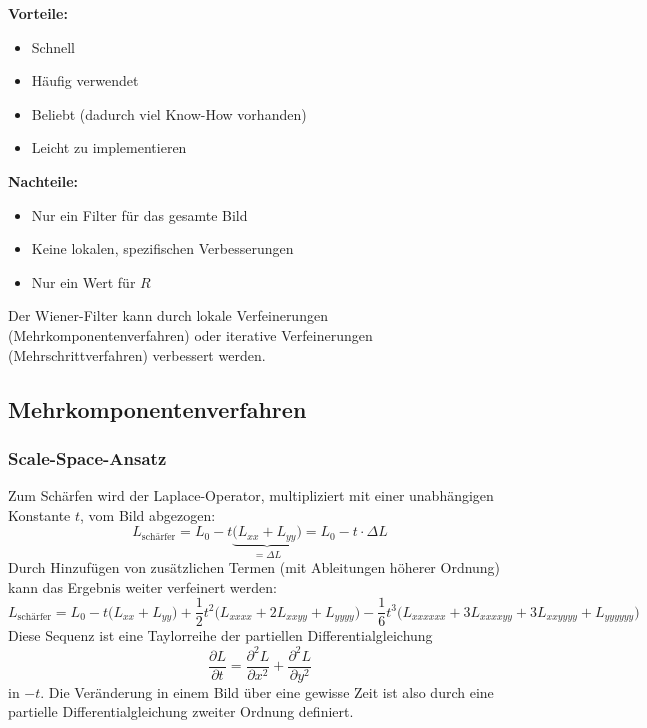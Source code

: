 			\textbf{Vorteile:}
			\begin{itemize}
				\item Schnell
				\item Häufig verwendet
				\item Beliebt (dadurch viel Know-How vorhanden)
				\item Leicht zu implementieren
			\end{itemize}
			\textbf{Nachteile:}
			\begin{itemize}
				\item Nur ein Filter für das gesamte Bild
				\item Keine lokalen, spezifischen Verbesserungen
				\item Nur ein Wert für \(R\)
			\end{itemize}
			Der Wiener-Filter kann \zB durch lokale Verfeinerungen (Mehrkomponentenverfahren) oder iterative Verfeinerungen (Mehrschrittverfahren) verbessert werden.

		\subsection{Mehrkomponentenverfahren}
			\subsubsection{Scale-Space-Ansatz}
				Zum Schärfen wird der Laplace-Operator, multipliziert mit einer unabhängigen Konstante \(t\), vom Bild abgezogen:
				\begin{equation*}
					L_\text{schärfer} = L_0 - t \underbrace{\big( L_{xx} + L_{yy} \big)}_{= \Delta L} = L_0 - t \cdot \Delta L
				\end{equation*}
				Durch Hinzufügen von zusätzlichen Termen (mit Ableitungen höherer Ordnung) kann das Ergebnis weiter verfeinert werden:
				\begin{equation*}
					L_\text{schärfer} = L_0 - t \big( L_{xx} + L_{yy} \big) + \frac{1}{2} t^2 \big( L_{xxxx} + 2L_{xxyy} + L_{yyyy} \big) - \frac{1}{6} t^3 \big( L_{xxxxxx} + 3L_{xxxxyy} + 3L_{xxyyyy} + L_{yyyyyy} \big)
				\end{equation*}
				Diese Sequenz ist eine Taylorreihe der partiellen Differentialgleichung
				\begin{equation*}
					\frac{\partial L}{\partial t} = \frac{\partial^2 L}{\partial x^2} + \frac{\partial^2 L}{\partial y^2}
				\end{equation*}
				in \(-t\). Die Veränderung in einem Bild über eine gewisse Zeit ist also durch eine partielle Differentialgleichung zweiter Ordnung definiert.

